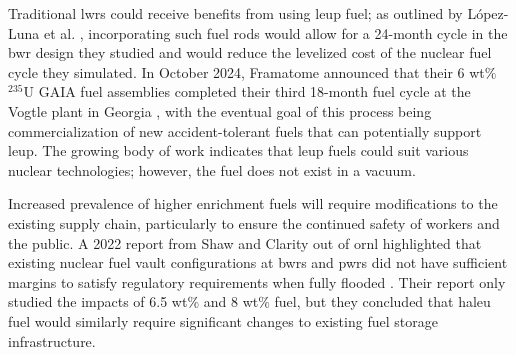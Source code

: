Traditional \glspl{lwr} could receive benefits from using \gls{leup} fuel; as outlined by L\'{o}pez-Luna et al. \cite{24_month_cycle_bwr}, incorporating such fuel rods would allow for a 24-month cycle in the \gls{bwr} design they studied and would reduce the levelized cost of the nuclear fuel cycle they simulated. In October 2024, Framatome announced that their 6 wt$\%$ $^{235}$U GAIA fuel assemblies completed their third 18-month fuel cycle at the Vogtle plant in Georgia \cite{framatome_press_2024}, with the eventual goal of this process being commercialization of new accident-tolerant fuels that can potentially support \gls{leup}. The growing body of work indicates that \gls{leup} fuels could suit various nuclear technologies; however, the fuel does not exist in a vacuum.

Increased prevalence of higher enrichment fuels will require modifications to the existing supply chain, particularly to ensure the continued safety of workers and the public. A 2022 report from Shaw and Clarity out of \gls{ornl} highlighted that existing nuclear fuel vault configurations at \glspl{bwr} and \glspl{pwr} did not have sufficient margins to satisfy regulatory requirements when fully flooded \cite{leup_atf_storage_impacts}. Their report only studied the impacts of 6.5 wt$\%$ and 8 wt$\%$ fuel, but they concluded that \gls{haleu} fuel would similarly require significant changes to existing fuel storage infrastructure.
